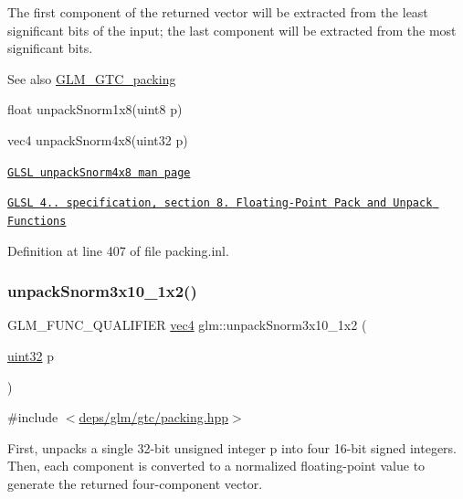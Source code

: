The first component of the returned vector will be extracted from the least significant bits of the input; the last component will be extracted from the most significant bits.

\begin{DoxySeeAlso}{See also}
\hyperlink{group__gtc__packing}{G\+L\+M\+\_\+\+G\+T\+C\+\_\+packing} 

float unpack\+Snorm1x8(uint8 p) 

vec4 unpack\+Snorm4x8(uint32 p) 

\href{http://www.opengl.org/sdk/docs/manglsl/xhtml/unpackSnorm4x8.xml}{\tt G\+L\+SL unpack\+Snorm4x8 man page} 

\href{http://www.opengl.org/registry/doc/GLSLangSpec.4.20.8.pdf}{\tt G\+L\+SL 4.. specification, section 8. Floating-\/\+Point Pack and Unpack Functions} 
\end{DoxySeeAlso}


Definition at line 407 of file packing.\+inl.

\mbox{\label{group__gtc__packing_ga8b8bb827a3743ca553d8702d3e337101}} 
\subsubsection{\texorpdfstring{unpack\+Snorm3x10\+\_\+1x2()}{unpackSnorm3x10\_1x2()}}
{\footnotesize\ttfamily G\+L\+M\+\_\+\+F\+U\+N\+C\+\_\+\+Q\+U\+A\+L\+I\+F\+I\+ER \hyperlink{group__core__types_ga5881b1b022d7fd1b7218f5916532dd02}{vec4} glm\+::unpack\+Snorm3x10\+\_\+1x2 (\begin{DoxyParamCaption}\item[{\hyperlink{group__gtc__type__precision_ga202b6a53c105fcb7e531f9b443518451}{uint32}}]{p }\end{DoxyParamCaption})}



{\ttfamily \#include $<$\hyperlink{gtc_2packing_8hpp}{deps/glm/gtc/packing.\+hpp}$>$}

First, unpacks a single 32-\/bit unsigned integer p into four 16-\/bit signed integers. Then, each component is converted to a normalized floating-\/point value to generate the returned four-\/component vector.

